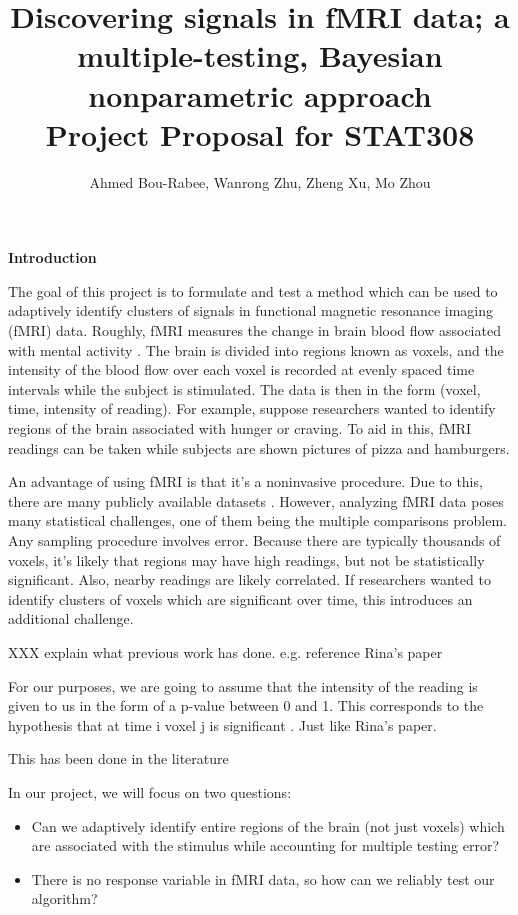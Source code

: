 \documentclass[12pt]{article}
\title{Discovering signals in fMRI data; 
a multiple-testing, Bayesian nonparametric approach   \\ \large{Project Proposal for STAT308}}
\author{Ahmed Bou-Rabee, Wanrong Zhu, Zheng Xu, Mo Zhou}
\begin{document}
\maketitle

{\bf Introduction } 

The goal of this project is to formulate and test a method which can be used to adaptively identify 
clusters of signals in functional magnetic resonance imaging (fMRI) data. 
Roughly, fMRI measures the change in brain blood flow associated 
with mental activity \cite{huettel2004functional}. The brain is divided into regions known as voxels, and the intensity 
of the blood flow over each voxel is recorded at evenly spaced time intervals while the subject is stimulated. The data is then in the form 
(voxel, time, intensity of reading). For example, suppose researchers wanted to identify regions 
of the brain associated with hunger or craving. To aid in this, fMRI readings can be taken while subjects are shown pictures of pizza and hamburgers. 

An advantage of using fMRI is that it's a noninvasive procedure.  Due to this, there are many publicly available datasets \cite{poldrack2013toward}.
However, analyzing fMRI data poses many statistical challenges, one of them being the multiple comparisons problem. 
 Any sampling procedure involves error.  Because there are typically thousands of voxels, it's likely that regions 
 may have high readings, but not be statistically significant.  Also, nearby readings are likely correlated.  If researchers 
 wanted to identify clusters of voxels which are significant over time, this introduces an additional challenge. 
 
 
 XXX  explain what previous work has done.  e.g. reference Rina's paper \cite{foygel2015p} 

 For our purposes, we are going to assume that the intensity of the reading is given to us in the form of a p-value between 0 and 1. 
 This corresponds to the hypothesis that 
 at time i voxel j is significant . Just like Rina's paper. 
 
 This has been done in the literature
 
   

In our project, we will focus on two questions: 
\begin{itemize}
\item Can we adaptively identify entire regions of the brain (not just voxels) which are associated with the stimulus while
accounting for multiple testing error?
\item There is no response variable in fMRI data, so how can we reliably test our algorithm? 
\end{itemize}
\end{document}
